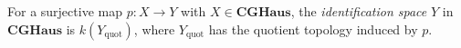 For a surjective map $p: X \to Y$ with $X \in \mathbf{CGHaus}$, the \emph{identification space} $Y$ in $\mathbf{CGHaus}$ is $k(Y_{\mathrm{quot}})$, where $Y_{\mathrm{quot}}$ has the quotient topology induced by $p$.
